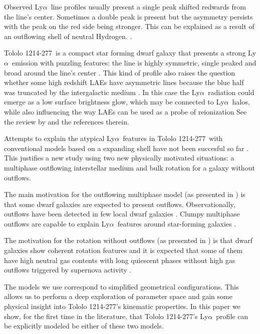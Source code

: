 \documentclass[a4,useAMS,usenatbib,usegraphicx]{mn2e}
\newcommand{\tol}{Tololo 1214-277}
\newcommand{\lya}{Ly$\alpha$}
\begin{document}
Observed \lya\ line profiles usually present a single peak shifted
redwards from the line's center. 
Sometimes a double peak is present but the asymmetry persists with 
the peak on the red side being stronger. 
This can be explained as a result of an outflowing shell of neutral Hydrogen.
\citep{2006A&A...460..397V,Orsi12,2012ApJ...751...29Y,2015ApJ...812..123G}.

\tol\ is a compact star forming dwarf galaxy that presents a
strong \lya\ emission with puzzling 
features: the line is highly symmetric, single peaked and broad around the
line's center \citep{Thuan97}.
This kind of profile also raises the question whether some high
redshift LAEs have asymmetric lines because the blue half was
truncated by the intergalactic medium \citep{2007MNRAS.377.1175D}. 
In this case the \lya\ radiation could emerge as a low surface
brightness glow, which may be connected to \lya\ halos, while also
influencing the way LAEs can be used as a probe of reionization
See the review by \cite{2014PASA...31...40D} and the references therein.

Attempts to explain the atypical \lya\ features in \tol\ with
conventional models based on a expanding shell have not been succesful
so far \citep{mashesse03,2015A&A...578A...7V}. 
This justifies a new study using two new physically motivated
situations: a multiphase outflowing interstellar medium and bulk rotation for a
galaxy without outflows.

The main motivation for the outflowing multiphase model (as presented
in \cite{Gronke2016}) is that some dwarf galaxies are expected to
present outflows.  
Observationally, outflows have been detected in few local dwarf galaxies
\citep{1998ApJ...506..222M,2005MNRAS.358.1453O}. 
Clumpy multiphase outflows are capable to explain \lya\ features around
star-forming galaxies
\citep{2010ApJ...717..289S,2012MNRAS.424.1672D}. 


The motivation for the rotation without outflows (as presented in
\cite{GaravitoCamargo2014}) is that dwarf galaxies show coherent
rotation features  \citep{2009A&A...493..871S} and it is expected that
some of them have high neutral gas contents with long quiescent phases
without high gas outflows triggered by supernova activity
\citep{2005A&A...433L...1B,2008ApJ...672..888T,2013MNRAS.434.2491G}.   



The models we use correspond to simplified geometrical configurations.
This allows us to perform a deep exploration of parameter space and
gain some physical insight into \tol's kinematic properties.
In this paper we show, for the first time in the literature, that \tol's
\lya\ profile can be explicitly modeled be either of these two
models. 
\end{document}
